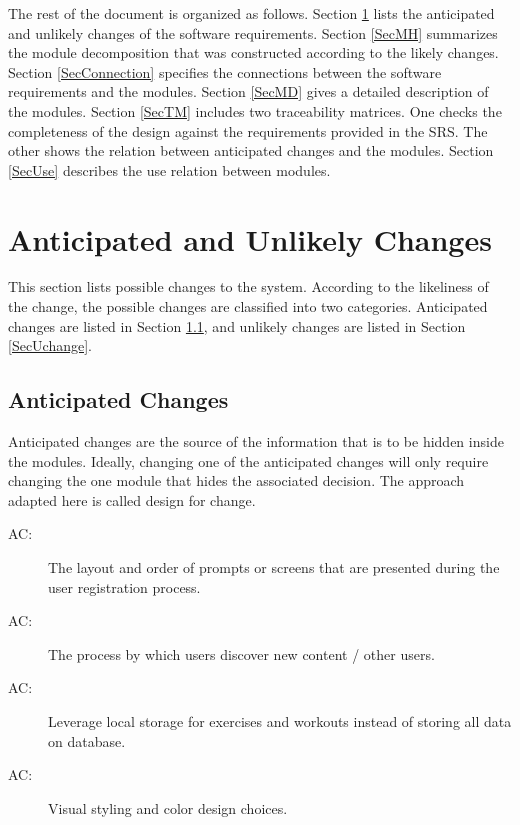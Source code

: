 \documentclass[12pt, titlepage]{article}
\newcounter{acnum}
\newcommand{\actheacnum}{AC\theacnum}
\begin{document}
The rest of the document is organized as follows. Section
\ref{SecChange} lists the anticipated and unlikely changes of the software
requirements. Section \ref{SecMH} summarizes the module decomposition that
was constructed according to the likely changes. Section \ref{SecConnection}
specifies the connections between the software requirements and the
modules. Section \ref{SecMD} gives a detailed description of the
modules. Section \ref{SecTM} includes two traceability matrices. One checks
the completeness of the design against the requirements provided in the SRS. The
other shows the relation between anticipated changes and the modules. Section
\ref{SecUse} describes the use relation between modules.

\section{Anticipated and Unlikely Changes} \label{SecChange}

This section lists possible changes to the system. According to the likeliness
of the change, the possible changes are classified into two
categories. Anticipated changes are listed in Section \ref{SecAchange}, and
unlikely changes are listed in Section \ref{SecUchange}.

\subsection{Anticipated Changes} \label{SecAchange}

Anticipated changes are the source of the information that is to be hidden
inside the modules. Ideally, changing one of the anticipated changes will only
require changing the one module that hides the associated decision. The approach
adapted here is called design for
change.

\begin{description}
\item[ \actheacnum \label{acLayout}:] The layout and order of prompts or screens that are presented during the user registration process.
\item[ \actheacnum \label{acDiscovery}:] The process by which users discover new content / other users.
\item[ \actheacnum \label{acStorage}:] Leverage local storage for exercises and workouts instead of storing all data on database. 
\item[ \actheacnum \label{acStyling}:] Visual styling and color design choices.
\end{description}
\end{document}
